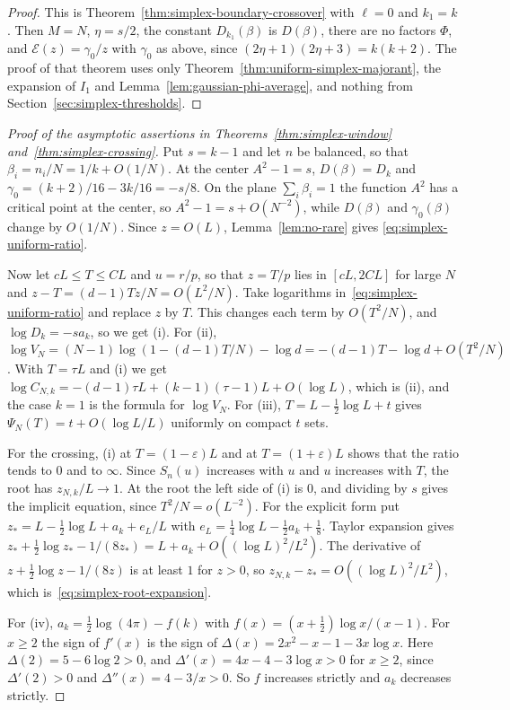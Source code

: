 \begin{proof}
This is Theorem~\ref{thm:simplex-boundary-crossover} with $\ell=0$ and $k_1=k$.
Then $M=N$, $\eta=s/2$, the constant $D_{k_1}(\beta)$ is $D(\beta)$, there are
no factors $\Phi$, and $\mathcal E(z)=\gamma_0/z$ with $\gamma_0$ as above,
since $(2\eta+1)(2\eta+3)=k(k+2)$. The proof of that theorem uses only
Theorem~\ref{thm:uniform-simplex-majorant}, the expansion of $I_1$ and
Lemma~\ref{lem:gaussian-phi-average}, and nothing from
Section~\ref{sec:simplex-thresholds}.
\end{proof}

\begin{proof}[Proof of the asymptotic assertions in
Theorems~\ref{thm:simplex-window} and~\ref{thm:simplex-crossing}]
Put $s=k-1$ and let $n$ be balanced, so that $\beta_i=n_i/N=1/k+O(1/N)$. At the
center $A^2-1=s$, $D(\beta)=D_k$ and $\gamma_0=(k+2)/16-3k/16=-s/8$. On the
plane $\sum_i\beta_i=1$ the function $A^2$ has a critical point at the center,
so $A^2-1=s+O(N^{-2})$, while $D(\beta)$ and $\gamma_0(\beta)$ change by
$O(1/N)$. Since $z=O(L)$, Lemma~\ref{lem:no-rare} gives
\eqref{eq:simplex-uniform-ratio}.

Now let $cL\le T\le CL$ and $u=r/p$, so that $z=T/p$ lies in $[cL,2CL]$ for large
$N$ and $z-T=(d-1)Tz/N=O(L^2/N)$. Take logarithms
in~\eqref{eq:simplex-uniform-ratio} and replace $z$ by $T$. This changes each term
by $O(T^2/N)$, and $\log D_k=-sa_k$, so we get (i). For (ii),
$\log V_N=(N-1)\log(1-(d-1)T/N)-\log d=-(d-1)T-\log d+O(T^2/N)$. With $T=\tau L$
and (i) we get $\log C_{N,k}=-(d-1)\tau L+(k-1)(\tau-1)L+O(\log L)$, which is (ii),
and the case $k=1$ is the formula for $\log V_N$. For (iii),
$T=L-\frac12\log L+t$ gives $\Psi_N(T)=t+O(\log L/L)$ uniformly on compact $t$
sets.

For the crossing, (i) at $T=(1-\varepsilon)L$ and at $T=(1+\varepsilon)L$ shows
that the ratio tends to $0$ and to $\infty$. Since $S_n(u)$ increases with $u$
and $u$ increases with $T$, the root has $z_{N,k}/L\to1$. At the root the left
side of (i) is $0$, and dividing by $s$ gives the implicit equation, since
$T^2/N=o(L^{-2})$. For the explicit form put
$z_*=L-\frac12\log L+a_k+e_L/L$ with $e_L=\frac14\log L-\frac12a_k+\frac18$.
Taylor expansion gives $z_*+\frac12\log z_*-1/(8z_*)=L+a_k+O((\log L)^2/L^2)$.
The derivative of $z+\frac12\log z-1/(8z)$ is at least $1$ for $z>0$, so
$z_{N,k}-z_*=O((\log L)^2/L^2)$, which is~\eqref{eq:simplex-root-expansion}.

For (iv), $a_k=\frac12\log(4\pi)-f(k)$ with $f(x)=(x+\frac12)\log x/(x-1)$. For
$x\ge2$ the sign of $f'(x)$ is the sign of $\Delta(x)=2x^2-x-1-3x\log x$. Here
$\Delta(2)=5-6\log2>0$, and $\Delta'(x)=4x-4-3\log x>0$ for $x\ge2$, since
$\Delta'(2)>0$ and $\Delta''(x)=4-3/x>0$. So $f$ increases strictly and $a_k$
decreases strictly.
\end{proof}

